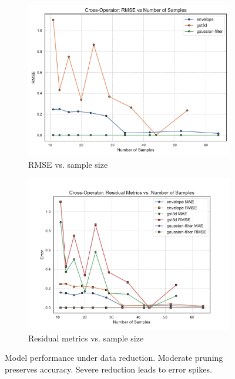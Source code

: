 \begin{figure}[htbp]
    \centering
    \begin{subfigure}[t]{0.49\textwidth}
        \includegraphics[width=\textwidth]{assets/images/05/cross_data_reduction_rmse}
        \caption{\ac{RMSE} vs. sample size}
    \end{subfigure}
    \hfill
    \begin{subfigure}[t]{0.49\textwidth}
        \includegraphics[width=\textwidth]{assets/images/05/residual_metrics_by_sample_size}
        \caption{Residual metrics vs. sample size}
    \end{subfigure}
    \caption{Model performance under data reduction. Moderate pruning preserves accuracy. Severe reduction leads to error spikes.}
    \label{fig:cross_data_reduction_and_residual}
\end{figure}

